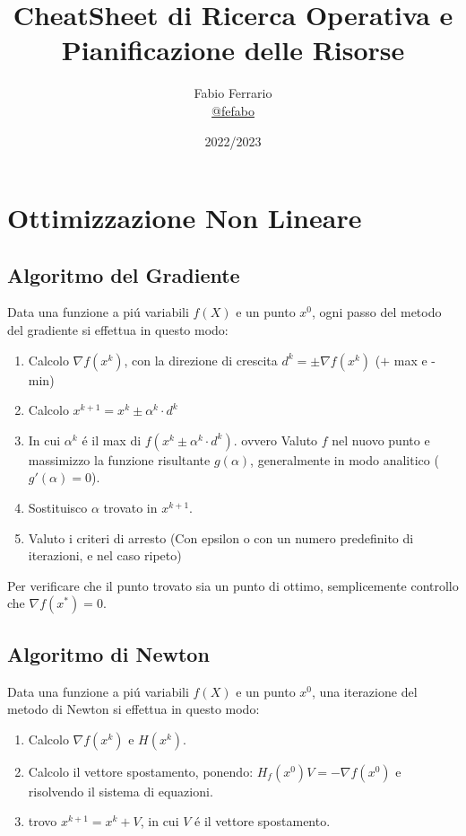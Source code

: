 \documentclass[12pt, a4paper, openany]{book}
\begin{document}
\title{CheatSheet di Ricerca Operativa e Pianificazione delle Risorse}

\author{
	Fabio Ferrario\\
	\small{\href{https://t.me/fefabo}{@fefabo}}
}
\date{2022/2023}

\maketitle

\tableofcontents

\chapter{Ottimizzazione Non Lineare}
\section{Algoritmo del Gradiente}
Data una funzione a piú variabili $f(X)$ e un punto $x^0$, ogni passo del metodo del gradiente si effettua in questo modo:
\begin{enumerate}
    \item Calcolo $\nabla f(x^k)$, con la direzione di crescita $d^k=\pm \nabla f(x^k)$ ($+$ max e - min)
    \item Calcolo $x^{k+1} = x^k \pm \alpha^k \cdot d^k$
    \item In cui $\alpha^k$ é il max di $f(x^k \pm \alpha^k \cdot d^k)$. ovvero
    Valuto $f$ nel nuovo punto e massimizzo la funzione risultante $g(\alpha)$, generalmente in modo analitico ($g'(\alpha)=0$).
    \item Sostituisco $\alpha$ trovato in $x^{k+1}$.
    \item Valuto i criteri di arresto (Con epsilon o con un numero predefinito di iterazioni, e nel caso ripeto)
\end{enumerate}
Per verificare che il punto trovato sia un punto di ottimo, semplicemente controllo che $\nabla f(x^*) = 0$.
\pagebreak

\section{Algoritmo di Newton}
Data una funzione a piú variabili $f(X)$ e un punto $x^0$, una iterazione del metodo di Newton si effettua in questo modo:
\begin{enumerate}
    \item Calcolo $\nabla f(x^k)$ e $H(x^k)$.
    \item Calcolo il vettore spostamento, ponendo: $H_f(x^0) V = - \nabla f(x^0)$ e risolvendo il sistema di equazioni.
    \item trovo $x^{k+1} = x^k + V$, in cui $V$ é il vettore spostamento.
\end{enumerate}
\end{document}

